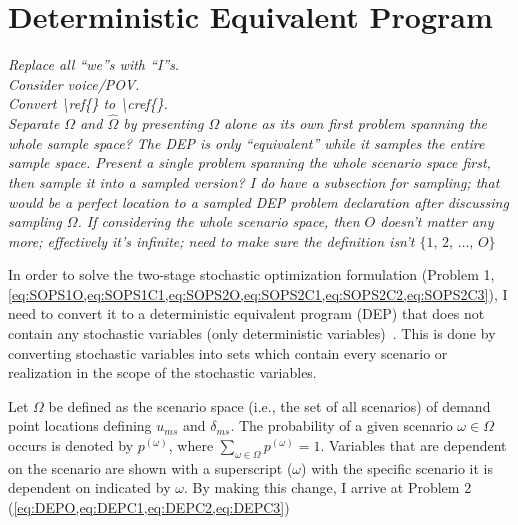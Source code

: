 \documentclass[12pt,dvipsnames]{report}
\newcommand\defeq{\mathrel{\overset{\makebox[0pt]{\mbox{\normalfont\tiny\sffamily def}}}{=}}}
\begin{document}
\section{Deterministic Equivalent Program} \label{sec:dep}

%
\textit{Replace all ``we''s with ``I''s.\\Consider voice/POV.\\Convert \textbackslash ref\{\} to \textbackslash cref\{\}.\\Separate $\Omega$ and $\hat{\Omega}$ by presenting $\Omega$ alone as its own first problem spanning the whole sample space?  The DEP is only ``equivalent'' while it samples the entire sample space.  Present a single problem spanning the whole scenario space first, then sample it into a sampled version?  I do have a subsection for sampling; that would be a perfect location to a sampled DEP problem declaration after discussing sampling $\Omega$.  If considering the whole scenario space, then $O$ doesn't matter any more; effectively it's infinite; need to make sure the definition isn't $\{1,\, 2,\, \dots,\, O\}$}

In order to solve the two-stage stochastic optimization formulation (Problem 1, \cref{eq:SOPS1O,eq:SOPS1C1,eq:SOPS2O,eq:SOPS2C1,eq:SOPS2C2,eq:SOPS2C3}), I need to convert it to a deterministic equivalent program (DEP) that does not contain any stochastic variables (only deterministic variables)~\cite{stochprogramming}.  This is done by converting stochastic variables into sets which contain every scenario or realization in the scope of the stochastic variables.


Let $\Omega$ be defined as the scenario space (i.e., the set of all scenarios) of demand point locations defining $u_{ms}$ and $\delta_{ms}$.  The probability of a given scenario $\omega \in \Omega$ occurs is denoted by $p^{(\omega)}$, where $\sum_{\omega \in \Omega} p^{(\omega)} = 1$.  Variables that are dependent on the scenario are shown with a superscript ($\omega$) with the specific scenario it is dependent on indicated by $\omega$.  By making this change, I arrive at Problem 2 (\cref{eq:DEPO,eq:DEPC1,eq:DEPC2,eq:DEPC3})
\end{document}
